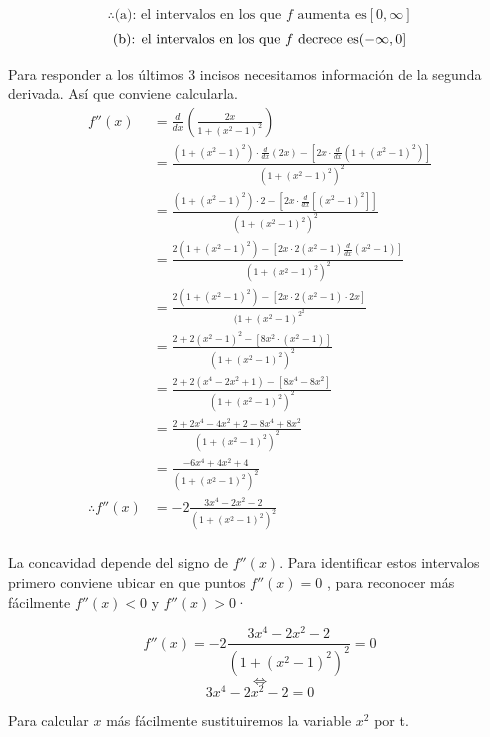 \documentclass[12pt]{article}
\begin{document}
 \[
 \therefore
 \text{(a):  el intervalos en los que $f$ aumenta es} [0, \infty]
   \]
\[
  \text {(b):  el intervalos en los que $f$ decrece  es}  (-\infty, 0] \\
    \]

    Para responder a los últimos 3 incisos necesitamos información de la segunda derivada. Así que conviene calcularla.
     \begin{equation*}
  \begin{split}
    f''(x)
    &= \frac{d}{dx}( \frac{2x}{ 1+(x^{2}-1)^{2}  } )  \\
    &= \frac{  ( 1+(x^{2}-1)^{2}) \cdot  \frac{d}{dx} (2x) - \left[ 2x \cdot  \frac{d}{dx}   ( 1+(x^{2}-1)^{2})  \right]  }{ (1+(x^{2}-1)^{2} )^{2}  } \\
    &= \frac{  ( 1+(x^{2}-1)^{2}) \cdot  2 - \left[ 2x \cdot  \frac{d}{dx}   [(x^{2}-1)^{2}]  \right]  }{ (1+(x^{2}-1)^{2} )^{2}  } \\
    &= \frac{  2( 1+(x^{2}-1)^{2}) - \left[ 2x \cdot     2(x^{2}-1) \frac{d}{dx} (x^{2}-1)  \right]  }{ (1+(x^{2}-1)^{2} )^{2}  } \\
    &= \frac{  2( 1+(x^{2}-1)^{2}) - \left[ 2x \cdot     2(x^{2}-1) \cdot  2x  \right]  }{ (1+(x^{2}-1)^{2} ^{2}  } \\
    &= \frac{   2+2(x^{2}-1)^{2} - \left[ 8x^{2} \cdot(x^{2}-1)\right]  }{ (1+(x^{2}-1)^{2} )^{2}  } \\
    &= \frac{   2+2(x^{4}-2x^{2}+ 1) - \left[ 8x^{4} - 8x^{2}  \right]  }{ (1+(x^{2}-1)^{2} )^{2}  } \\
    &= \frac{   2+2x^{4}-4x^{2}+ 2 - 8x^{4} + 8x^{2}  }{ (1+(x^{2}-1)^{2} )^{2}  } \\
    &= \frac{-6x^{4} + 4x^{2} +4 }{ (1+(x^{2}-1)^{2} )^{2}  } \\
    \therefore
    f''(x)
    &= -2\frac{3x^{4} - 2x^{2} - 2 }{ (1+(x^{2}-1)^{2} )^{2}  } \\
  \end{split}
     \end{equation*}

     La concavidad depende del signo de $ f''(x)$. Para identificar estos intervalos primero conviene ubicar en que puntos $ f''(x) = 0$ , para reconocer más fácilmente $f''(x)<0$ y $f''(x)>0$·

\[ f''(x) = -2\frac{3x^{4} - 2x^{2} - 2 }{ (1+(x^{2}-1)^{2} )^{2}  } = 0  \]
\[ \iff \]
\[ 3x^{4} - 2x^{2} - 2 = 0 \]

Para calcular  $x$ más fácilmente sustituiremos la variable $x^{2}$ por t.
\end{document}
